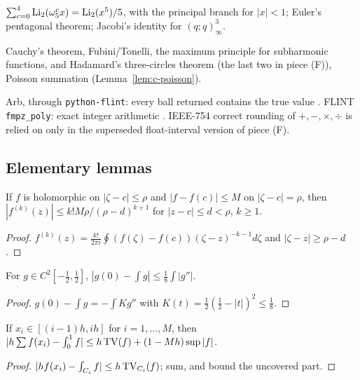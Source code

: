 \begin{fact}[identities]\label{fact:identities}
$\sum_{c=0}^4\operatorname{Li}_2(\omega_5^cx)=\operatorname{Li}_2(x^5)/5$, with the principal branch for $|x|<1$; Euler's pentagonal theorem; Jacobi's
identity for $(q;q)_\infty^3$.
\end{fact}

\begin{fact}\label{fact:complex}
Cauchy's theorem, Fubini/Tonelli, the maximum principle for subharmonic functions, and Hadamard's three-circles theorem (the
last two in piece (F)), Poisson summation (Lemma~\ref{lem:c-poisson}).
\end{fact}

\begin{fact}\label{fact:software}
Arb, through \texttt{python-flint}: every ball returned contains the true value \cite{Arb}. FLINT \texttt{fmpz\_poly}:
exact integer arithmetic \cite{FLINT}. IEEE-754 correct rounding of $+,-,\times,\div$ is relied on only in the superseded
float-interval version of piece (F).
\end{fact}

\subsection{Elementary lemmas}\label{app:elementary}

\begin{lemma}[Cauchy]\label{lem:cauchy}
If $f$ is holomorphic on $|\zeta-c|\le\rho$ and $|f-f(c)|\le M$ on $|\zeta-c|=\rho$, then
$|f^{(k)}(z)|\le k!M\rho/(\rho-d)^{k+1}$ for $|z-c|\le d<\rho$, $k\ge1$.
\end{lemma}
\begin{proof}
$f^{(k)}(z)=\frac{k!}{2\pi i}\oint(f(\zeta)-f(c))(\zeta-z)^{-k-1}d\zeta$ and $|\zeta-z|\ge\rho-d$.
\end{proof}

\begin{lemma}\label{lem:midpoint}
For $g\in C^2[-\frac12,\frac12]$, $|g(0)-\int g|\le\frac18\int|g''|$.
\end{lemma}
\begin{proof}
$g(0)-\int g=-\int K g''$ with $K(t)=\frac12(\frac12-|t|)^2\le\frac18$.
\end{proof}

\begin{lemma}\label{lem:koksma}
If $x_i\in[(i-1)h,ih]$ for $i=1,\dots,M$, then $|h\sum f(x_i)-\int_0^1f|\le h\operatorname{TV}(f)+(1-Mh)\sup|f|$.
\end{lemma}
\begin{proof}
$|hf(x_i)-\int_{C_i}f|\le h\operatorname{TV}_{C_i}(f)$; sum, and bound the uncovered part.
\end{proof}
